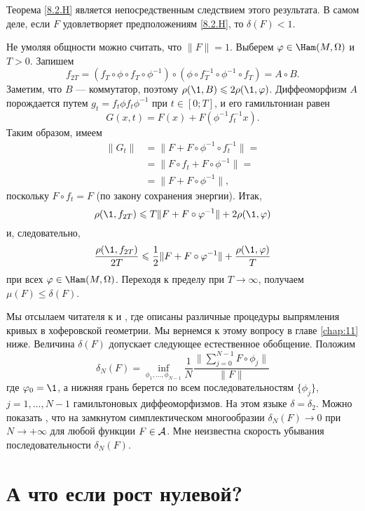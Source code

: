 Теорема \ref{8.2.H} является непосредственным следствием этого
результата. 
В самом деле, если $F$ удовлетворяет предположениям \ref{8.2.H}, то
$\delta (F) <1$. 

Не умоляя общности можно считать, что $\|F \| = 1$.
Выберем $\phi \in \Ham (M, \Omega)$ и $T> 0$.
Запишем 
\[f_{2T}= (f_T \circ \phi \circ f_T \circ \phi^{-1}) \circ (\phi \circ
f_T^{-1} \circ \phi^{-1} \circ f_T) = A \circ B.\] 
Заметим, что $B$ --- коммутатор, поэтому $\rho (\1, B) \le 2\rho (\1, \phi)$.
Диффеоморфизм $A$ порождается путем $g_t = f_t \phi f_t \phi ^{-1}$
при $t \in [0;T]$, и его гамильтониан равен  
\[G (x, t) = F (x) + F (\phi^{-1} f_t^{-1} x).\]
Таким образом, имеем 
\begin{align*}
\|G_t \| &= \|F + F \circ \phi ^{-1} \circ f_t ^{-1} \| =
\\
&=\|F \circ f_t + F \circ \phi ^{-1} \| =
\\
&=\|F + F \circ \phi ^{-1} \|,\end{align*}
поскольку $F \circ f_t = F$ (по закону сохранения энергии).
Итак, 
\[\rho (\1, f_{2T}) \le T \| F + F \circ \phi ^{-1} \| + 2\rho (\1, \phi)\]
и, следовательно, 
\[\frac{\rho (\1, f_{2T})}{2T}
\le\frac12 \|F + F \circ \phi ^{-1} \| + \frac{\rho (\1, \phi)}{T}\]
при всех $\phi \in \Ham (M , \Omega)$.
Переходя к пределу при $T \to \infty$, получаем $\mu (F) \le \delta (F)$.
\qeds

Мы отсылаем читателя к \cite{LM2} и \cite{P9}, где описаны различные
процедуры выпрямления кривых в хоферовской геометрии. 
Мы вернемся к этому вопросу в главе \ref{chap:11} ниже.
Величина $\delta (F)$ допускает следующее естественное обобщение.
Положим 
\[
\delta_N(F)
=
\inf_{\phi_1 ,\dots, \phi_{N-1}}
\frac1N
\frac{\|\sum_{j=0}^{N-1} F \circ \phi_j\|}{\|F\|}
\] 
где $\phi_0 = \1$, а нижняя грань берется по всем последовательностям
$\{\phi_j\}$, $j = 1,\dots, N-1 $ гамильтоновых диффеоморфизмов. 
На этом языке $\delta = \delta_2$. 
Можно показать \cite{P9}, что на замкнутом симплектическом
многообразии $\delta_N (F) \to 0$ при $N \to + \infty$ для любой
функции $F \in \mathcal{A}$. 
Мне неизвестна скорость убывания последовательности $\delta_N (F)$. 

\section{А что если рост нулевой?}\label{sec:8.4}

